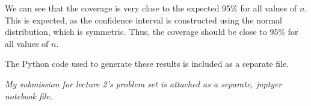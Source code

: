 \documentclass{article}
\newcommand{\gap}{\vspace{1 em}}
\begin{document}
\begin{enumerate}
\begin{solution}
{\begin{center}
\begin{tabular}{c|c|c}
                \end{tabular}
            \end{center}
            We can see that the coverage is very close to the expected 95\% for all values of $n$. This is expected, as the confidence interval is constructed using the normal distribution, which is symmetric. Thus, the coverage should be close to 95\% for all values of $n$.

            The Python code used to generate these results is included as a separate file.
        }
    \end{solution}
\end{enumerate}

\gap

\textit{My submission for lecture 2's problem set is attached as a separate, juptyer notebook file.}
\end{document}
